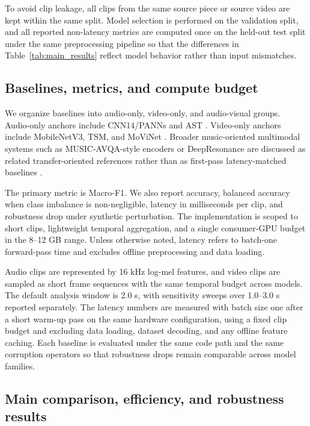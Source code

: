 To avoid clip leakage, all clips from the same source piece or source video are kept within the same split. Model selection is performed on the validation split, and all reported non-latency metrics are computed once on the held-out test split under the same preprocessing pipeline so that the differences in Table~\ref{tab:main_results} reflect model behavior rather than input mismatches.

\subsection{Baselines, metrics, and compute budget}

We organize baselines into audio-only, video-only, and audio-visual groups. Audio-only anchors include CNN14/PANNs and AST \citep{Kong2020PANNs,Gong2021AST}. Video-only anchors include MobileNetV3, TSM, and MoViNet \citep{Howard2019MobileNetV3,Lin2022TSM,Kondratyuk2021MoViNets}. Broader music-oriented multimodal systems such as MUSIC-AVQA-style encoders or DeepResonance are discussed as related transfer-oriented references rather than as first-pass latency-matched baselines \citep{Li2022MusicAVQA,Diao2024MPQA,Mao2025DeepResonance}.

The primary metric is Macro-F1. We also report accuracy, balanced accuracy when class imbalance is non-negligible, latency in milliseconds per clip, and robustness drop under synthetic perturbation. The implementation is scoped to short clips, lightweight temporal aggregation, and a single consumer-GPU budget in the 8--12 GB range. Unless otherwise noted, latency refers to batch-one forward-pass time and excludes offline preprocessing and data loading.

Audio clips are represented by 16 kHz log-mel features, and video clips are sampled as short frame sequences with the same temporal budget across models. The default analysis window is 2.0 s, with sensitivity sweeps over 1.0--3.0 s reported separately. The latency numbers are measured with batch size one after a short warm-up pass on the same hardware configuration, using a fixed clip budget and excluding data loading, dataset decoding, and any offline feature caching. Each baseline is evaluated under the same code path and the same corruption operators so that robustness drops remain comparable across model families.

\subsection{Main comparison, efficiency, and robustness results}

